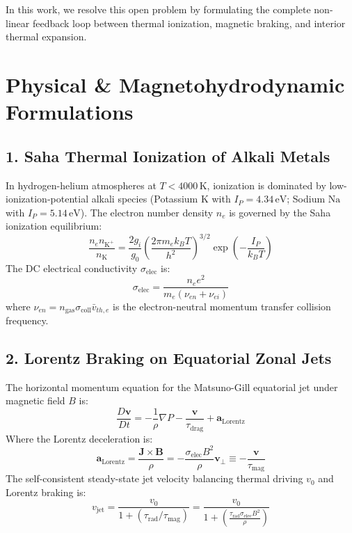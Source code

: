 \documentclass[11pt,a4paper]{article}
\begin{document}
In this work, we resolve this open problem by formulating the complete non-linear feedback loop between thermal ionization, magnetic braking, and interior thermal expansion.

\section{Physical \& Magnetohydrodynamic Formulations}

\subsection{1. Saha Thermal Ionization of Alkali Metals}
In hydrogen-helium atmospheres at $T < 4000\,\mathrm{K}$, ionization is dominated by low-ionization-potential alkali species (Potassium $\mathrm{K}$ with $I_P = 4.34\,\mathrm{eV}$; Sodium $\mathrm{Na}$ with $I_P = 5.14\,\mathrm{eV}$). The electron number density $n_e$ is governed by the Saha ionization equilibrium:
\begin{equation}
\frac{n_e n_{\mathrm{K}^+}}{n_{\mathrm{K}}} = \frac{2 g_i}{g_0} \left( \frac{2\pi m_e k_B T}{h^2} \right)^{3/2} \exp\left( -\frac{I_P}{k_B T} \right)
\end{equation}
The DC electrical conductivity $\sigma_{\text{elec}}$ is:
\begin{equation}
\sigma_{\text{elec}} = \frac{n_e e^2}{m_e (\nu_{en} + \nu_{ei})}
\end{equation}
where $\nu_{en} = n_{\text{gas}} \sigma_{\text{coll}} \bar{v}_{th,e}$ is the electron-neutral momentum transfer collision frequency.

\subsection{2. Lorentz Braking on Equatorial Zonal Jets}
The horizontal momentum equation for the Matsuno-Gill equatorial jet under magnetic field $B$ is:
\begin{equation}
\frac{D\mathbf{v}}{Dt} = -\frac{1}{\rho}\nabla P - \frac{\mathbf{v}}{\tau_{\text{drag}}} + \mathbf{a}_{\text{Lorentz}}
\end{equation}
Where the Lorentz deceleration is:
\begin{equation}
\mathbf{a}_{\text{Lorentz}} = \frac{\mathbf{J} \times \mathbf{B}}{\rho} = -\frac{\sigma_{\text{elec}} B^2}{\rho} \mathbf{v}_\perp \equiv -\frac{\mathbf{v}}{\tau_{\text{mag}}}
\end{equation}
The self-consistent steady-state jet velocity balancing thermal driving $v_0$ and Lorentz braking is:
\begin{equation}
v_{\text{jet}} = \frac{v_0}{1 + (\tau_{\text{rad}} / \tau_{\text{mag}})} = \frac{v_0}{1 + \left( \frac{\tau_{\text{rad}} \sigma_{\text{elec}} B^2}{\rho} \right)}
\end{equation}
\end{document}
